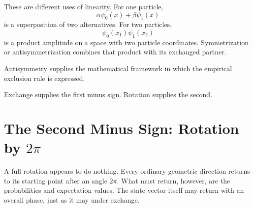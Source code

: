 These are different uses of linearity. For one particle,
\begin{equation}
\alpha\psi_0(x)+\beta\psi_1(x)
\end{equation}
is a superposition of two alternatives. For two particles,
\begin{equation}
\psi_0(x_1)\psi_1(x_2)
\end{equation}
is a product amplitude on a space with two particle coordinates. Symmetrization or antisymmetrization combines that product with its exchanged partner.

\begin{classroomqa}
\end{classroomqa}

\begin{classroomqa}
\end{classroomqa}

Antisymmetry supplies the mathematical framework in which the empirical exclusion rule is expressed.

\begin{classroomqa}
\end{classroomqa}

Exchange supplies the first minus sign. Rotation supplies the second.

\section{The Second Minus Sign: Rotation by \(2\pi\)}

A full rotation appears to do nothing. Every ordinary geometric direction returns to its starting point after an angle \(2\pi\). What must return, however, are the probabilities and expectation values. The state vector itself may return with an overall phase, just as it may under exchange.

